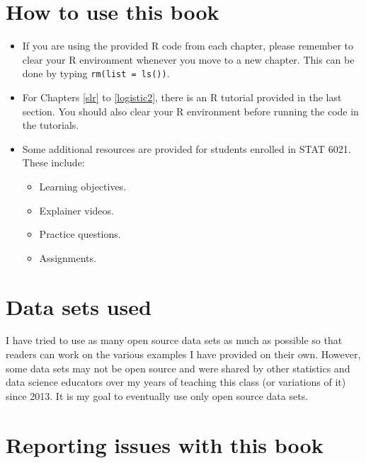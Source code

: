 \documentclass[
]{book}
\providecommand{\tightlist}{%
  \setlength{\itemsep}{0pt}\setlength{\parskip}{0pt}}
\begin{document}
\hypertarget{how-to-use-this-book}{%
\section*{How to use this book}\label{how-to-use-this-book}}

\begin{itemize}
\item
  If you are using the provided R code from each chapter, please remember to clear your R environment whenever you move to a new chapter. This can be done by typing \texttt{rm(list\ =\ ls())}.
\item
  For Chapters \ref{slr} to \ref{logistic2}, there is an R tutorial provided in the last section. You should also clear your R environment before running the code in the tutorials.
\item
  Some additional resources are provided for students enrolled in STAT 6021. These include:

  \begin{itemize}
  \tightlist
  \item
    Learning objectives.
  \item
    Explainer videos.
  \item
    Practice questions.
  \item
    Assignments.
  \end{itemize}
\end{itemize}

\hypertarget{data-sets-used}{%
\section*{Data sets used}\label{data-sets-used}}

I have tried to use as many open source data sets as much as possible so that readers can work on the various examples I have provided on their own. However, some data sets may not be open source and were shared by other statistics and data science educators over my years of teaching this class (or variations of it) since 2013. It is my goal to eventually use only open source data sets.

\hypertarget{reporting-issues-with-this-book}{%
\section*{Reporting issues with this book}\label{reporting-issues-with-this-book}}
\end{document}
